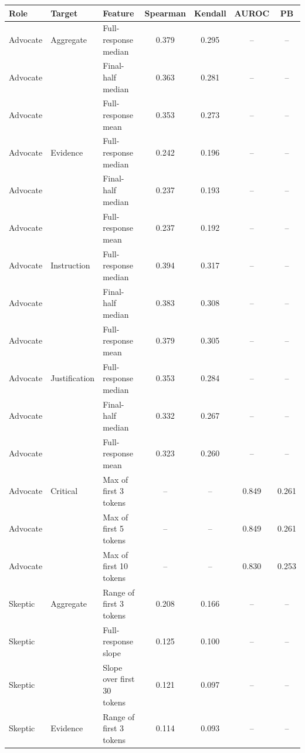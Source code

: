 \documentclass[11pt]{article}
\begin{document}
\begin{table}[t]
\centering
\scriptsize
\begin{tabular}{l l l c c c c}
\toprule
Role & Target & Feature & Spearman & Kendall & AUROC & PB \\
\midrule
Advocate & Aggregate     & Full-response median & 0.379 & 0.295 & --    & -- \\
Advocate &               & Final-half median    & 0.363 & 0.281 & --    & -- \\
Advocate &               & Full-response mean   & 0.353 & 0.273 & --    & -- \\
\midrule
Advocate & Evidence      & Full-response median & 0.242 & 0.196 & --    & -- \\
Advocate &               & Final-half median    & 0.237 & 0.193 & --    & -- \\
Advocate &               & Full-response mean & 0.237 & 0.192 & --    & -- \\
\midrule
Advocate & Instruction   & Full-response median & 0.394 & 0.317 & --    & -- \\
Advocate &               & Final-half median    & 0.383 & 0.308 & --    & -- \\
Advocate &               & Full-response mean   & 0.379 & 0.305 & --    & -- \\
\midrule
Advocate & Justification & Full-response median & 0.353 & 0.284 & --    & -- \\
Advocate &               & Final-half median    & 0.332 & 0.267 & --    & -- \\
Advocate &               & Full-response mean   & 0.323 & 0.260 & --    & -- \\
\midrule
Advocate & Critical      & Max of first 3 tokens  & -- & -- & 0.849 & 0.261 \\
Advocate &               & Max of first 5 tokens  & -- & -- & 0.849 & 0.261 \\
Advocate &               & Max of first 10 tokens & -- & -- & 0.830 & 0.253 \\
\midrule
Skeptic  & Aggregate     & Range of first 3 tokens & 0.208 & 0.166 & -- & -- \\
Skeptic  &               & Full-response slope     & 0.125 & 0.100 & -- & -- \\
Skeptic  &               & Slope over first 30 tokens & 0.121 & 0.097 & -- & -- \\
\midrule
Skeptic  & Evidence      & Range of first 3 tokens & 0.114 & 0.093 & -- & -- \\

\end{tabular}
\end{table}
\end{document}
